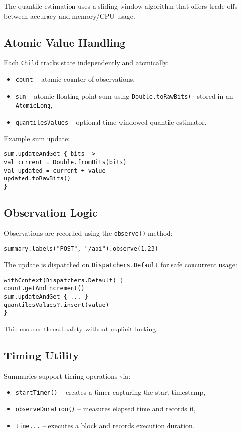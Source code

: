 The quantile estimation uses a sliding window algorithm that offers trade-offs between accuracy and memory/CPU usage.

\subsection{Atomic Value Handling}

Each \texttt{Child} tracks state independently and atomically:
\begin{itemize}
\item \texttt{count} – atomic counter of observations,
\item \texttt{sum} – atomic floating-point sum using \texttt{Double.toRawBits()} stored in an \texttt{AtomicLong},
\item \texttt{quantilesValues} – optional time-windowed quantile estimator.
\end{itemize}

Example sum update:
\begin{verbatim}
sum.updateAndGet { bits ->
val current = Double.fromBits(bits)
val updated = current + value
updated.toRawBits()
}
\end{verbatim}

\subsection{Observation Logic}

Observations are recorded using the \texttt{observe()} method:

\begin{verbatim}
summary.labels("POST", "/api").observe(1.23)
\end{verbatim}

The update is dispatched on \texttt{Dispatchers.Default} for safe concurrent usage:

\begin{verbatim}
withContext(Dispatchers.Default) {
count.getAndIncrement()
sum.updateAndGet { ... }
quantilesValues?.insert(value)
}
\end{verbatim}

This ensures thread safety without explicit locking.

\subsection{Timing Utility}

Summaries support timing operations via:
\begin{itemize}
\item \texttt{startTimer()} – creates a timer capturing the start timestamp,
\item \texttt{observeDuration()} – measures elapsed time and records it,
\item \texttt{time{...}} – executes a block and records execution duration.
\end{itemize}

